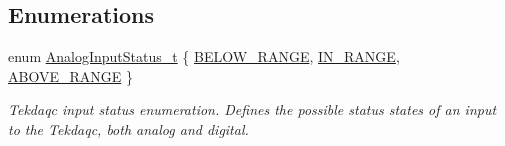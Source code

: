 \subsection*{Enumerations}
\begin{DoxyCompactItemize}
\item 
enum \hyperlink{group__analog__input_ga99258f91accf55ecea49707692a3889b}{Analog\-Input\-Status\-\_\-t} \{ \hyperlink{group__analog__input_gga99258f91accf55ecea49707692a3889baab4ee4ac298eaa158dc5d14eb9ca8b60}{B\-E\-L\-O\-W\-\_\-\-R\-A\-N\-G\-E}, 
\hyperlink{group__analog__input_gga99258f91accf55ecea49707692a3889ba19a150b47d1db72e2947bef12bd1ca7f}{I\-N\-\_\-\-R\-A\-N\-G\-E}, 
\hyperlink{group__analog__input_gga99258f91accf55ecea49707692a3889baa2ccf1ed52430dd6b0070370d5125d7e}{A\-B\-O\-V\-E\-\_\-\-R\-A\-N\-G\-E}
 \}
\begin{DoxyCompactList}\small\item\em Tekdaqc input status enumeration. Defines the possible status states of an input to the Tekdaqc, both analog and digital. \end{DoxyCompactList}\end{DoxyCompactItemize}
